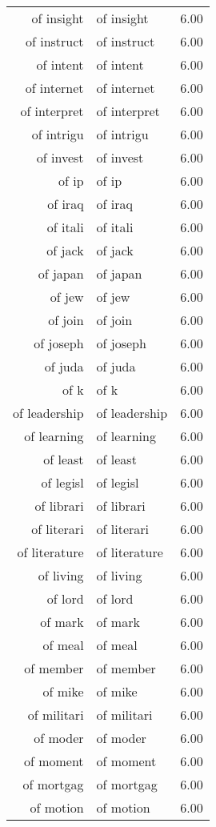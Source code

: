 \begin{table}[ht]
\begin{tabular}{rlr}
  of insight & of insight & 6.00 \\ 
  of instruct & of instruct & 6.00 \\ 
  of intent & of intent & 6.00 \\ 
  of internet & of internet & 6.00 \\ 
  of interpret & of interpret & 6.00 \\ 
  of intrigu & of intrigu & 6.00 \\ 
  of invest & of invest & 6.00 \\ 
  of ip & of ip & 6.00 \\ 
  of iraq & of iraq & 6.00 \\ 
  of itali & of itali & 6.00 \\ 
  of jack & of jack & 6.00 \\ 
  of japan & of japan & 6.00 \\ 
  of jew & of jew & 6.00 \\ 
  of join & of join & 6.00 \\ 
  of joseph & of joseph & 6.00 \\ 
  of juda & of juda & 6.00 \\ 
  of k & of k & 6.00 \\ 
  of leadership & of leadership & 6.00 \\ 
  of learning & of learning & 6.00 \\ 
  of least & of least & 6.00 \\ 
  of legisl & of legisl & 6.00 \\ 
  of librari & of librari & 6.00 \\ 
  of literari & of literari & 6.00 \\ 
  of literature & of literature & 6.00 \\ 
  of living & of living & 6.00 \\ 
  of lord & of lord & 6.00 \\ 
  of mark & of mark & 6.00 \\ 
  of meal & of meal & 6.00 \\ 
  of member & of member & 6.00 \\ 
  of mike & of mike & 6.00 \\ 
  of militari & of militari & 6.00 \\ 
  of moder & of moder & 6.00 \\ 
  of moment & of moment & 6.00 \\ 
  of mortgag & of mortgag & 6.00 \\ 
  of motion & of motion & 6.00 \\ 

\end{tabular}
\end{table}

